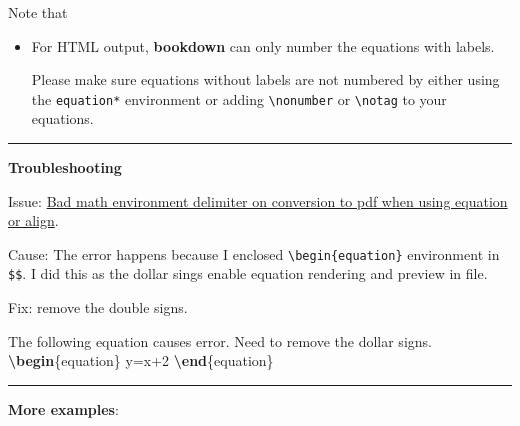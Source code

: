 \documentclass[
  a4paper,
  twoside,
  openright]{book}
\newenvironment{Shaded}{\begin{snugshade}}{\end{snugshade}}
\newcommand{\ExtensionTok}[1]{#1}
\newcommand{\KeywordTok}[1]{\textcolor[rgb]{0.13,0.29,0.53}{\textbf{#1}}}
\newcommand{\NormalTok}[1]{#1}
\newcommand{\SpecialStringTok}[1]{\textcolor[rgb]{0.31,0.60,0.02}{#1}}
\theoremstyle{definition}
\theoremstyle{definition}
\theoremstyle{definition}
\theoremstyle{definition}
\theoremstyle{remark}
\begin{document}
Note that

\begin{itemize}
\item
  For HTML output, \textbf{bookdown} can only number the equations with labels.

  Please make sure equations without labels are not numbered by either using the \texttt{equation*} environment or adding \texttt{\textbackslash{}nonumber} or \texttt{\textbackslash{}notag} to your equations.
\end{itemize}

\begin{center}\rule{0.5\linewidth}{0.5pt}\end{center}

\textbf{Troubleshooting}

Issue: \href{https://github.com/jupyter/nbconvert/issues/232}{Bad math environment delimiter on conversion to pdf when using equation or align}.

Cause: The error happens because I enclosed \texttt{\textbackslash{}begin\{equation\}} environment in \texttt{\$\$}. I did this as the dollar sings enable equation rendering and preview in file.

Fix: remove the double signs.

\begin{Shaded}
\begin{Highlighting}[]
\NormalTok{The following equation causes error. Need to remove the dollar signs.}
\SpecialStringTok{$$}
\KeywordTok{\textbackslash{}begin}\NormalTok{\{}\ExtensionTok{equation}\NormalTok{\}}
\SpecialStringTok{y=x+2}
\KeywordTok{\textbackslash{}end}\NormalTok{\{}\ExtensionTok{equation}\NormalTok{\}}
\SpecialStringTok{$$}
\end{Highlighting}
\end{Shaded}

\begin{center}\rule{0.5\linewidth}{0.5pt}\end{center}

\textbf{More examples}:
\end{document}
